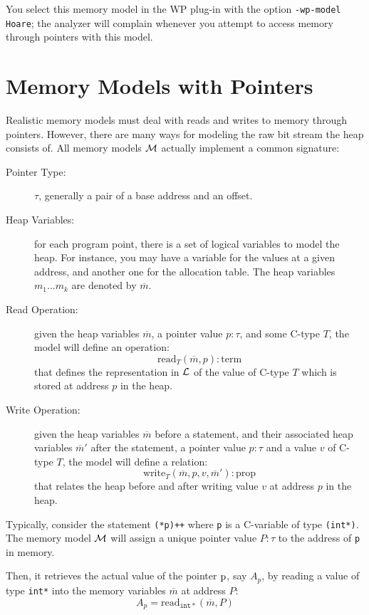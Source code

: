 You select this memory model in the \textsf{WP} plug-in with the option
\texttt{-wp-model Hoare}; the analyzer will complain whenever you
attempt to access memory through pointers with this model.

\section{Memory Models with Pointers}
\label{wp-model-pointers}

Realistic memory models must deal with reads and writes to memory
through pointers. However, there are many ways for modeling the raw
bit stream the heap consists of. All memory models $\cal{M}$ actually
implement a common signature:
\begin{description}
\item[Pointer Type:] $\tau$, generally a pair of a base address and an offset.
\item[Heap Variables:] for each program point, there is a set of
  logical variables to model the heap. For instance, you may have a
  variable for the values at a given address, and another one for the
  allocation table. The heap variables $m_1\ldots m_k$ are
  denoted by $\overline{m}$.
\item[Read Operation:] given the heap variables $\overline{m}$, a
  pointer value $p:\tau$, and some \textsf{C}-type $T$, the
  model will define an operation:
  \[\mathrm{read}_T(\overline{m},p) : \mathrm{term}\]
  that defines the representation in $\cal{L}$ of the value of
  \textsf{C}-type $T$ which is stored at address $p$ in the heap.
\item[Write Operation:] given the heap variables $\overline{m}$ before
  a statement, and their associated heap variables $\overline{m}'$
  after the statement, a pointer value $p:\tau$ and a value $v$ of
  \textsf{C}-type $T$, the model will define a relation:
  \[\mathrm{write}_T(\overline{m},p,v,\overline{m}') : \mathrm{prop}\] that relates the
  heap before and after writing value $v$ at address $p$ in the heap.
\end{description}

Typically, consider the statement \lstinline{(*p)++} where
\lstinline{p} is a \textsf{C}-variable of type \lstinline{(int*)}.
The memory model $\cal{M}$ will assign a unique pointer value
$P:\tau$ to the address of \lstinline{p} in memory. 

Then, it retrieves the actual value of the pointer
$\lstinline{p}$, say $A_p$, by reading a value of type
\lstinline{int*} into the memory variables $\overline{m}$ at address
$P$:
\[ A_p = \mathrm{read}_{\mathtt{int*}}(\overline{m},P) \]

